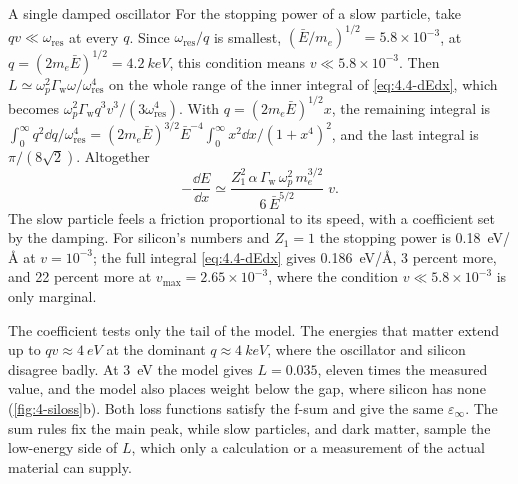 \begin{workedexample}{A single damped oscillator}
For the stopping power of a slow particle, take $qv \ll \omega_{\mathrm{res}}$ at every $q$. Since $\omega_{\mathrm{res}}/q$ is smallest, $(\bar E/m_e)^{1/2} = 5.8\times10^{-3}$, at $q = (2m_e\bar E)^{1/2} = \SI{4.2}{keV}$, this condition means $v \ll 5.8\times10^{-3}$. Then $L \simeq \omega_p^2\varGamma_{\mathrm{w}}\omega/\omega_{\mathrm{res}}^4$ on the whole range of the inner integral of \cref{eq:4.4-dEdx}, which becomes $\omega_p^2\varGamma_{\mathrm{w}}q^3v^3/(3\omega_{\mathrm{res}}^4)$. With $q = (2m_e\bar E)^{1/2}x$, the remaining integral is $\int_0^\infty q^2\dd q/\omega_{\mathrm{res}}^4 = (2m_e\bar E)^{3/2}\bar E^{-4}\int_0^\infty x^2\dd x/(1 + x^4)^2$, and the last integral is $\pi/(8\sqrt2)$. Altogether
\begin{equation*}
  -\frac{\dd E}{\dd x} \simeq \frac{Z_1^2\,\alpha\,\varGamma_{\mathrm{w}}\,\omega_p^2\,m_e^{3/2}}{6\,\bar E^{5/2}}\;v .
\end{equation*}
The slow particle feels a friction proportional to its speed, with a coefficient set by the damping. For silicon's numbers and $Z_1 = 1$ the stopping power is \SI{0.18}{eV/\angstrom} at $v = 10^{-3}$; the full integral \cref{eq:4.4-dEdx} gives \SI{0.186}{eV/\angstrom}, 3 percent more, and 22 percent more at $v_{\mathrm{max}} = 2.65\times10^{-3}$, where the condition $v \ll 5.8\times10^{-3}$ is only marginal.

The coefficient tests only the tail of the model. The energies that matter extend up to $qv \approx \SI{4}{eV}$ at the dominant $q \approx \SI{4}{keV}$, where the oscillator and silicon disagree badly. At \SI{3}{eV} the model gives $L = 0.035$, eleven times the measured value, and the model also places weight below the gap, where silicon has none (\cref{fig:4-siloss}b). Both loss functions satisfy the f-sum and give the same $\varepsilon_\infty$. The sum rules fix the main peak, while slow particles, and dark matter, sample the low-energy side of $L$, which only a calculation or a measurement of the actual material can supply.
\end{workedexample}
